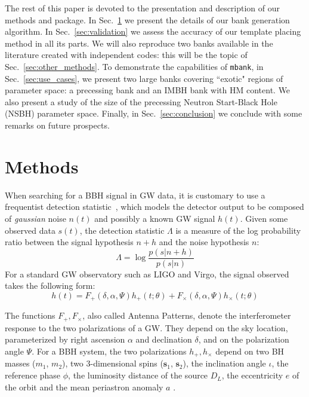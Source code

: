 \documentclass[twocolumn,showpacs,preprintnumbers,nofootinbib,prd,
superscriptaddress,10pt]{revtex4-2}
\begin{document}
The rest of this paper is devoted to the presentation and description of our methods and package.
In Sec.~\ref{sec:methods} we present the details of our bank generation algorithm.
In Sec.~\ref{sec:validation} we assess the accuracy of our template placing method in all its parts.
We will also reproduce two banks available in the literature \cite{Harry:2017weg, Sakon:2022ibh} created with independent codes: this will be the topic of Sec.~\ref{sec:other_methods}.
To demonstrate the capabilities of \texttt{mbank}, in Sec.~\ref{sec:use_cases}, we present two large banks covering ``exotic" regions of parameter space: a precessing bank and an IMBH bank with HM content. We also present a study of the size of the precessing Neutron Start-Black Hole (NSBH) parameter space.
Finally, in Sec.~\ref{sec:conclusion} we conclude with some remarks on future prospects.

\section{Methods} \label{sec:methods}

When searching for a BBH signal in GW data, it is customary to use a frequentist detection statistic~\cite{Creighton_book, Maggiore:2007ulw, Harry:2016ijz, Harry:2017weg}, which models the detector output to be composed of {\it gaussian} noise $n(t)$ and possibly a known GW signal $h(t)$.
Given some observed data $s(t)$, the detection statistic $\Lambda$ is a measure of the log probability ratio between the signal hypothesis $n+h$ and the noise hypothesis $n$:
\begin{equation}\label{eq:LL}
	\Lambda = \log\frac{p(s|n+h)}{p(s| n)}
\end{equation}
For a standard GW observatory such as LIGO and Virgo, the signal observed takes the following form:
\begin{equation}\label{eq:signal_model}
	h(t) = F_+(\delta, \alpha, \Psi) h_+(t;\theta) + F_\times(\delta, \alpha, \Psi) h_\times(t;\theta)
\end{equation}

The functions $F_+, F_\times$, also called Antenna Patterns, denote the interferometer response to the two polarizations of a GW. They depend on the sky location, parameterized by right ascension $\alpha$ and declination $\delta$, and on the polarization angle $\Psi$. 
For a BBH system, the two polarizations $h_+, h_\times$ depend on two BH masses ($m_1$, $m_2$), two 3-dimensional spins ($\mathbf{s}_1$, $\mathbf{s}_2$), the inclination angle $\iota$, the reference phase $\phi$, the luminosity distance of the source $D_L$, the eccentricity $e$ of the orbit and the mean periastron anomaly $a$ \cite{Sathyaprakash_2009}.
\end{document}
